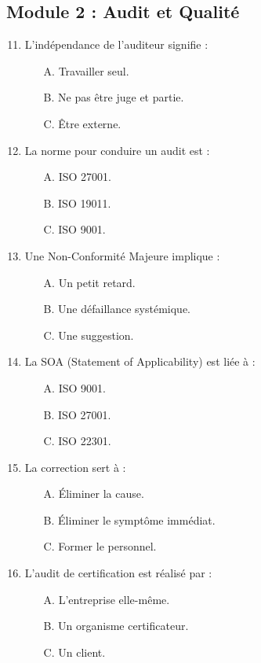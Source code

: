 \subsection*{Module 2 : Audit et Qualité}
\begin{enumerate}
    \setcounter{enumi}{10}
    \item L'indépendance de l'auditeur signifie :
    \begin{itemize} \item[A.] Travailler seul. \item[B.] Ne pas être juge et partie. \item[C.] Être externe. \end{itemize}
    \item La norme pour conduire un audit est :
    \begin{itemize} \item[A.] ISO 27001. \item[B.] ISO 19011. \item[C.] ISO 9001. \end{itemize}
    \item Une Non-Conformité Majeure implique :
    \begin{itemize} \item[A.] Un petit retard. \item[B.] Une défaillance systémique. \item[C.] Une suggestion. \end{itemize}
    \item La SOA (Statement of Applicability) est liée à :
    \begin{itemize} \item[A.] ISO 9001. \item[B.] ISO 27001. \item[C.] ISO 22301. \end{itemize}
    \item La correction sert à :
    \begin{itemize} \item[A.] Éliminer la cause. \item[B.] Éliminer le symptôme immédiat. \item[C.] Former le personnel. \end{itemize}
    \item L'audit de certification est réalisé par :
    \begin{itemize} \item[A.] L'entreprise elle-même. \item[B.] Un organisme certificateur. \item[C.] Un client. \end{itemize}

\end{enumerate}
